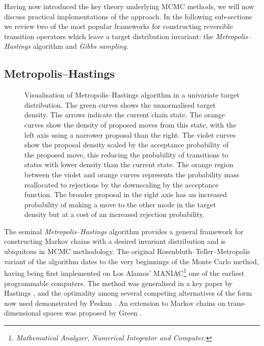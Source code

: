 Having now introduced the key theory underlying \ac{MCMC} methods, we will now discuss practical implementations of the approach. In the following sub-sections we review two of the most popular frameworks for constructing reversible transition operators which leave a target distribution invariant: the \emph{Metropolis--Hastings} algorithm and \emph{Gibbs sampling}. %

\subsection{Metropolis--Hastings}

\begin{figure}[t]
\centering
{}
\caption[Visualisation of Metropolis--Hastings algorithm.]{Visualisation of Metropolis--Hastings algorithm in a univariate target distribution. The green curves shows the unnormalised target density. The arrows indicate the current chain state. The orange curves show the density of proposed moves from this state, with the left axis using a narrower proposal than the right. The violet curves show the proposal density scaled by the acceptance probability of the proposed move, this reducing the probability of transitions to states with lower density than the current state. The orange region between the violet and orange curves represents the probability mass reallocated to rejections by the downscaling by the acceptance function. The broader proposal in the right axis has an increased probability of making a move to the other mode in the target density but at a cost of an increased rejection probability.}
\label{fig:metropolis-hastings}
\end{figure}

The seminal \emph{Metropolis--Hastings} algorithm provides a general framework for constructing Markov chains with a desired invariant distribution and is ubiquitous in \ac{MCMC} methodology. The original Rosenbluth--Teller--Metropolis variant of the algorithm \citep{metropolis1953equation} dates to the very beginnings of the Monte Carlo method, having being first implemented on Los Alamos' MANIAC\footnote{\emph{Mathematical Analyzer, Numerical Integrator and Computer.}} one of the earliest programmable computers. The method was generalised in a key paper by Hastings \citep{hastings1970monte}, and the optimality among several competing alternatives of the form now used demonstrated by Peskun \cite{peskun1973optimum}. An extension to Markov chains on trans-dimensional spaces was proposed by Green \citep{green1995reversible}.

